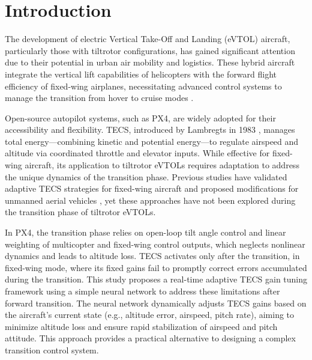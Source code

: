 \documentclass[journal,article,submit,pdftex,moreauthors]{Definitions/mdpi}
\begin{document}
\section{Introduction}
The development of electric Vertical Take-Off and Landing (eVTOL) aircraft, particularly those with tiltrotor configurations, has gained significant attention due to their potential in urban air mobility and logistics. These hybrid aircraft integrate the vertical lift capabilities of helicopters with the forward flight efficiency of fixed-wing airplanes, necessitating advanced control systems to manage the transition from hover to cruise modes \cite{ref-journal}.

Open-source autopilot systems, such as PX4, are widely adopted for their accessibility and flexibility. TECS, introduced by Lambregts in 1983 \cite{lambregts1983}, manages total energy—combining kinetic and potential energy—to regulate airspeed and altitude via coordinated throttle and elevator inputs. While effective for fixed-wing aircraft, its application to tiltrotor eVTOLs requires adaptation to address the unique dynamics of the transition phase. Previous studies have validated adaptive TECS strategies for fixed-wing aircraft \cite{bosworth2016} and proposed modifications for unmanned aerial vehicles \cite{bosworthNA}, yet these approaches have not been explored during the transition phase of tiltrotor eVTOLs.

In PX4, the transition phase relies on open-loop tilt angle control and linear weighting of multicopter and fixed-wing control outputs, which neglects nonlinear dynamics and leads to altitude loss. TECS activates only after the transition, in fixed-wing mode, where its fixed gains fail to promptly correct errors accumulated during the transition. This study proposes a real-time adaptive TECS gain tuning framework using a simple neural network to address these limitations after forward transition. The neural network dynamically adjusts TECS gains based on the aircraft’s current state (e.g., altitude error, airspeed, pitch rate), aiming to minimize altitude loss and ensure rapid stabilization of airspeed and pitch attitude. This approach provides a practical alternative to designing a complex transition control system.
\end{document}
